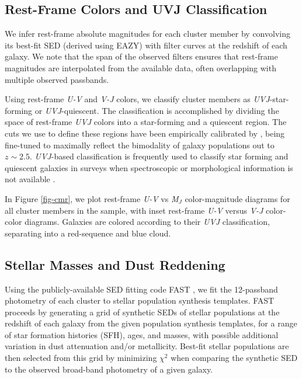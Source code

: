 
\subsection{Rest-Frame Colors and UVJ Classification}\label{sec-UVJ}

We infer rest-frame absolute magnitudes for each cluster member by convolving its best-fit SED (derived using EAZY) with filter curves at the redshift of each galaxy.
We note that the span of the observed filters ensures that rest-frame magnitudes are interpolated from the available data, often overlapping with multiple observed passbands.

Using rest-frame \textit{U-V} and \textit{V-J} colors, we classify cluster members as \textit{UVJ}-star-forming or \textit{UVJ}-quiescent.
The classification is accomplished by dividing the space of rest-frame \textit{UVJ} colors into a star-forming and a quiescent region.
The cuts we use to define these regions have been empirically calibrated by \citet{Williams:2009tt}, being fine-tuned to maximally reflect the bimodality of galaxy populations out to $z\sim2.5$.
\textit{UVJ}-based classification is frequently used to classify star forming and quiescent galaxies in surveys when spectroscopic or morphological information is not available \citep{Wuyts:2007aa,Williams:2009tt,Whitaker:2011aa,Patel:2012ab,van-der-Burg:2013zn,Whitaker:2013rz,muzzin2013,Strazzullo:2013aa}.

In Figure \ref{fig-cmr}, we plot rest-frame \textit{U-V} vs \textit{M$_J$} color-magnitude diagrams for all cluster members in the sample, with inset rest-frame \textit{U-V} versus \textit{V-J} color-color diagrams.
Galaxies are colored according to their \textit{UVJ} classification, separating into a red-sequence and blue cloud.

\subsection{Stellar Masses and Dust Reddening}\label{sec-fast}

Using the publicly-available SED fitting code FAST \citep{Kriek:2009eq}, we fit the 12-passband photometry of each cluster to \citet[hereafter BC03]{Bruzual:2003by} stellar population synthesis templates.
FAST proceeds by generating a grid of synthetic SEDs of stellar populations at the redshift of each galaxy from the given population synthesis templates, for a range of star formation histories (SFH), ages, and masses, with possible additional variation in dust attenuation and/or metallicity.
Best-fit stellar populations are then selected from this grid by minimizing ${\chi}^2$ when comparing the synthetic SED to the observed broad-band photometry of a given galaxy.

